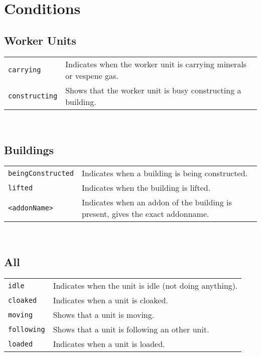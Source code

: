 \section{Conditions}
\label{conditions}

\subsection{Worker Units}
\begin{tabularx}{\textwidth}{lX}
 \verb|carrying| & Indicates when the worker unit is carrying minerals or vespene gas. \\
 \verb|constructing| & Shows that the worker unit is busy constructing a building.
\end{tabularx} \\

\subsection{Buildings}
\begin{tabularx}{\textwidth}{lX}
 \verb|beingConstructed| & Indicates when a building is being constructed. \\
 \verb|lifted| & Indicates when the building is lifted. \\
 \verb|<addonName>| & Indicates when an addon of the building is present, gives the exact addonname.
\end{tabularx} \\

\subsection{All}
\begin{tabularx}{\textwidth}{lX}
 \verb|idle| & Indicates when the unit is idle (not doing anything).\\
 \verb|cloaked| & Indicates when a unit is cloaked.\\
 \verb|moving| & Shows that a unit is moving.\\
 \verb|following| & Shows that a unit is following an other unit.\\
 \verb|loaded| & Indicates when a unit is loaded.\\
\end{tabularx} \\

